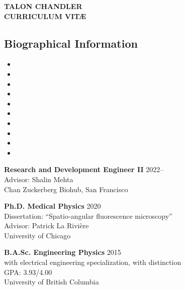 \documentclass[12pt,letterpaper]{article}
\begin{document}
\begin{center}
{\Large \textbf{TALON CHANDLER}}\\
{\textbf{CURRICULUM VIT\AE}}\\
\end{center}

\vspace{-1em}

\subsection*{Biographical Information}
\begin{itemize}[noitemsep]
\item[]  
\item[]  
\item[]  
\item[] \itab{} 
\item[] \itab{} 
\item[]  
\item[]  
\item[]  
\item[]  
\item[] \itab{} 
\end{itemize}

\begin{benumerate}{1}
  \item[] \textbf{Research and Development Engineer II} \hfill 2022--\\
  Advisor: Shalin Mehta \\
  Chan Zuckerberg Biohub, San Francisco
\end{benumerate}

\begin{benumerate}{2}
\item
  \textbf{Ph.D. Medical Physics} \hfill 2020\\
  Dissertation: ``Spatio-angular fluorescence microscopy''\\
  Advisor: Patrick La Rivi\`ere \\
  University of Chicago
\item
  \textbf{B.A.Sc. Engineering Physics} \hfill 2015\\
  with electrical engineering specialization, with distinction\\
  GPA: 3.93/4.00\\
  University of British Columbia
\end{benumerate}
\end{document}
